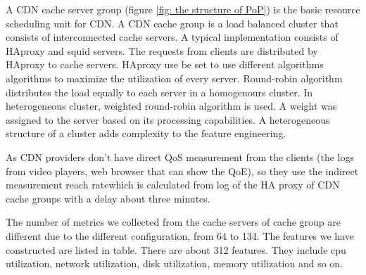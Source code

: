 \documentclass[5p]{elsarticle}
\newcommand{\dabiaolv}{reach rate}
\begin{document}
A CDN cache server group (figure \ref{fig: the structure of PoP}) is the basic resource scheduling unit for CDN. A CDN cache group is a load balanced cluster that consists of interconnected cache servers. A typical implementation consists of HAproxy and squid servers. The requests from clients are distributed by HAproxy to cache servers. HAproxy use be set to use different algorithms algorithms to maximize the utilization of every server. Round-robin algorithm distributes the load equally to each server in a homogenours cluster. In heterogeneous cluster, weighted round-robin algorithm is used. A weight was assigned to the server based on its processing capabilities. A heterogeneous structure of a cluster adds complexity to the feature engineering.

As CDN providers don't have direct QoS measurement from the clients (the logs from video players, web browser that can show the QoE), so they use the indirect measurement \dabiaolv which is calculated from log of the HA proxy of CDN cache groups with a delay about three minutes. 

The number of metrics we collected from the cache servers of cache group are different due to the different configuration, from 64 to 134. The features we have constructed are listed in table. There are about 312 features. They include cpu utilization, network utilization, disk utilization, memory utilization and so on.
\end{document}
